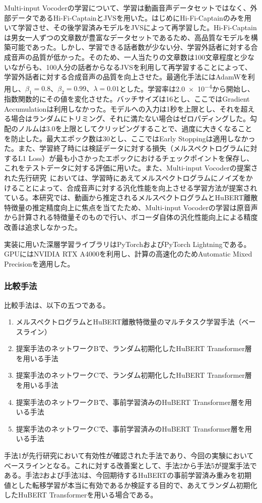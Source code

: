 \documentclass[12pt]{jarticle}
\numberwithin{equation}{section}    %
\numberwithin{figure}{section}      %
\numberwithin{table}{section}      %
\begin{document}
Multi-input Vocoderの学習について、学習は動画音声データセットではなく、外部データであるHi-Fi-CaptainとJVSを用いた。はじめにHi-Fi-Captainのみを用いて学習させ、その後学習済みモデルをJVSによって再学習した。Hi-Fi-Captainは男女一人ずつの文章数が豊富なデータセットであるため、高品質なモデルを構築可能であった。しかし、学習できる話者数が少ない分、学習外話者に対する合成音声の品質が低かった。そのため、一人当たりの文章数は100文章程度と少ないながらも、100人分の話者からなるJVSを利用して再学習することによって、学習外話者に対する合成音声の品質を向上させた。最適化手法にはAdamWを利用し、$\beta_{1} = 0.8$、$\beta_{2} = 0.99$、$\lambda = 0.01$とした。学習率は\num{2.0e-4}から開始し、指数関数的にその値を変化させた。バッチサイズは16とし、ここではGradient Accumulationは利用しなかった。モデルへの入力は1秒を上限とし、それを超える場合はランダムにトリミング、それに満たない場合はゼロパディングした。勾配のノルムは3.0を上限としてクリッピングすることで、過度に大きくなることを防止した。最大エポック数は30とし、ここではEarly Stoppingは適用しなかった。また、学習終了時には検証データに対する損失（メルスペクトログラムに対するL1 Loss）が最も小さかったエポックにおけるチェックポイントを保存し、これをテストデータに対する評価に用いた。また、Multi-input Vocoderの提案された先行研究~\cite{choi2023intelligible}においては、学習時にあえてメルスペクトログラムにノイズをかけることによって、合成音声に対する汎化性能を向上させる学習方法が提案されている。本研究では、動画から推定されるメルスペクトログラムとHuBERT離散特徴量の推定精度向上に焦点を当てたため、Multi-input Vocoderの学習は原音声から計算される特徴量そのもので行い、ボコーダ自体の汎化性能向上による精度改善は追求しなかった。

実装に用いた深層学習ライブラリはPyTorchおよびPyTorch Lightningである。GPUにはNVIDIA RTX A4000を利用し、計算の高速化のためAutomatic Mixed Precisionを適用した。

\subsubsection{比較手法}
\label{sec4:subsubsection:methods}
比較手法は、以下の五つである。
\begin{enumerate}
    \item メルスペクトログラムとHuBERT離散特徴量のマルチタスク学習手法（ベースライン）
    \item 提案手法のネットワークBで、ランダム初期化したHuBERT Transformer層を用いる手法
    \item 提案手法のネットワークCで、ランダム初期化したHuBERT Transformer層を用いる手法
    \item 提案手法のネットワークBで、事前学習済みのHuBERT Transformer層を用いる手法
    \item 提案手法のネットワークCで、事前学習済みのHuBERT Transformer層を用いる手法
\end{enumerate}
手法1が先行研究において有効性が確認された手法であり、今回の実験においてベースラインとなる。これに対する改善案として、手法2から手法5が提案手法である。手法2および手法3は、今回期待するHuBERTの事前学習済み重みを初期値とした転移学習が本当に有効であるか検証する目的で、あえてランダム初期化したHuBERT Transformerを用いる場合である。
\end{document}
